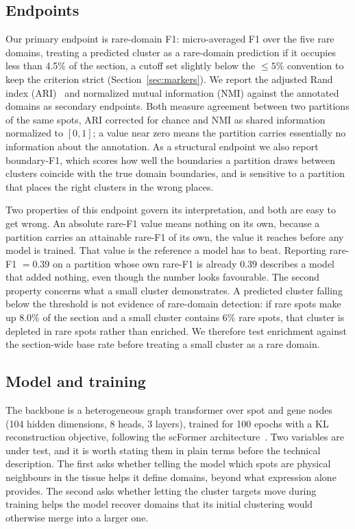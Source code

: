 \documentclass[twocolumn,10pt]{article}
\begin{document}
\subsection{Endpoints}

Our primary endpoint is rare-domain F1: micro-averaged F1 over the five rare domains, treating a predicted cluster as a rare-domain prediction if it occupies less than 4.5\% of the section, a cutoff set slightly below the $\leq 5\%$ convention to keep the criterion strict (Section~\ref{sec:markers}). We report the adjusted Rand index (ARI)~\cite{hubert,sklearn} and normalized mutual information (NMI) against the annotated domains as secondary endpoints. Both measure agreement between two partitions of the same spots, ARI corrected for chance and NMI as shared information normalized to $[0,1]$; a value near zero means the partition carries essentially no information about the annotation. As a structural endpoint we also report boundary-F1, which scores how well the boundaries a partition draws between clusters coincide with the true domain boundaries, and is sensitive to a partition that places the right clusters in the wrong places.

Two properties of this endpoint govern its interpretation, and both are easy to get wrong. An absolute rare-F1 value means nothing on its own, because a partition carries an attainable rare-F1 of its own, the value it reaches before any model is trained. That value is the reference a model has to beat. Reporting rare-F1 $= 0.39$ on a partition whose own rare-F1 is already $0.39$ describes a model that added nothing, even though the number looks favourable. The second property concerns what a small cluster demonstrates. A predicted cluster falling below the threshold is not evidence of rare-domain detection: if rare spots make up 8.0\% of the section and a small cluster contains 6\% rare spots, that cluster is depleted in rare spots rather than enriched. We therefore test enrichment against the section-wide base rate before treating a small cluster as a rare domain.

\subsection{Model and training}

The backbone is a heterogeneous graph transformer over spot and gene nodes (104 hidden dimensions, 8 heads, 3 layers), trained for 100 epochs with a KL reconstruction objective, following the scFormer architecture~\cite{scformer}. Two variables are under test, and it is worth stating them in plain terms before the technical description. The first asks whether telling the model which spots are physical neighbours in the tissue helps it define domains, beyond what expression alone provides. The second asks whether letting the cluster targets move during training helps the model recover domains that its initial clustering would otherwise merge into a larger one.
\end{document}
